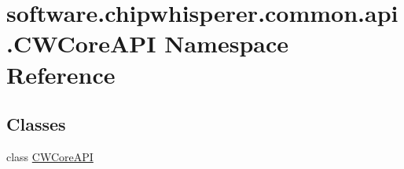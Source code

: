 \hypertarget{namespacesoftware_1_1chipwhisperer_1_1common_1_1api_1_1CWCoreAPI}{}\section{software.\+chipwhisperer.\+common.\+api.\+C\+W\+Core\+A\+P\+I Namespace Reference}
\label{namespacesoftware_1_1chipwhisperer_1_1common_1_1api_1_1CWCoreAPI}
\subsection*{Classes}
\begin{DoxyCompactItemize}
\item 
class \hyperlink{classsoftware_1_1chipwhisperer_1_1common_1_1api_1_1CWCoreAPI_1_1CWCoreAPI}{C\+W\+Core\+A\+P\+I}
\end{DoxyCompactItemize}
